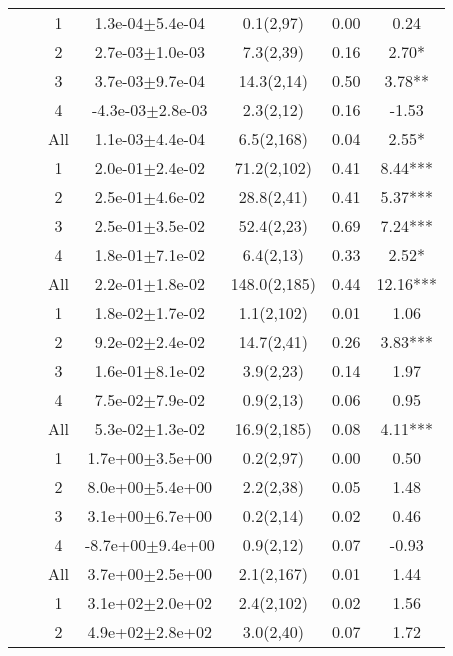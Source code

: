 \begin{longtable}{llccccS[table-format=-2.2, table-space-text-post = {***}]}
   \midrule
{} & {} & 1 &  1.3e-04$\pm$5.4e-04 & 0.1(2,97) & 0.00 & 0.24 \\ 
   &  & 2 &  2.7e-03$\pm$1.0e-03 & 7.3(2,39) & 0.16 & 2.70* \\ 
   &  & 3 &  3.7e-03$\pm$9.7e-04 & 14.3(2,14) & 0.50 & 3.78** \\ 
   &  & 4 & -4.3e-03$\pm$2.8e-03 & 2.3(2,12) & 0.16 & -1.53 \\ 
   &  & All &  1.1e-03$\pm$4.4e-04 & 6.5(2,168) & 0.04 & 2.55* \\ 
   \midrule
{} & {} & 1 &  2.0e-01$\pm$2.4e-02 & 71.2(2,102) & 0.41 & 8.44*** \\ 
   &  & 2 &  2.5e-01$\pm$4.6e-02 & 28.8(2,41) & 0.41 & 5.37*** \\ 
   &  & 3 &  2.5e-01$\pm$3.5e-02 & 52.4(2,23) & 0.69 & 7.24*** \\ 
   &  & 4 &  1.8e-01$\pm$7.1e-02 & 6.4(2,13) & 0.33 & 2.52* \\ 
   &  & All &  2.2e-01$\pm$1.8e-02 & 148.0(2,185) & 0.44 & 12.16*** \\ 
   \midrule
{} & {} & 1 &  1.8e-02$\pm$1.7e-02 & 1.1(2,102) & 0.01 & 1.06 \\ 
   &  & 2 &  9.2e-02$\pm$2.4e-02 & 14.7(2,41) & 0.26 & 3.83*** \\ 
   &  & 3 &  1.6e-01$\pm$8.1e-02 & 3.9(2,23) & 0.14 & 1.97 \\ 
   &  & 4 &  7.5e-02$\pm$7.9e-02 & 0.9(2,13) & 0.06 & 0.95 \\ 
   &  & All &  5.3e-02$\pm$1.3e-02 & 16.9(2,185) & 0.08 & 4.11*** \\ 
   \midrule
{} & {} & 1 &  1.7e+00$\pm$3.5e+00 & 0.2(2,97) & 0.00 & 0.50 \\ 
   &  & 2 &  8.0e+00$\pm$5.4e+00 & 2.2(2,38) & 0.05 & 1.48 \\ 
   &  & 3 &  3.1e+00$\pm$6.7e+00 & 0.2(2,14) & 0.02 & 0.46 \\ 
   &  & 4 & -8.7e+00$\pm$9.4e+00 & 0.9(2,12) & 0.07 & -0.93 \\ 
   &  & All &  3.7e+00$\pm$2.5e+00 & 2.1(2,167) & 0.01 & 1.44 \\ 
   \midrule
{} & {} & 1 &  3.1e+02$\pm$2.0e+02 & 2.4(2,102) & 0.02 & 1.56 \\ 
   &  & 2 &  4.9e+02$\pm$2.8e+02 & 3.0(2,40) & 0.07 & 1.72 \\ 

\end{longtable}
